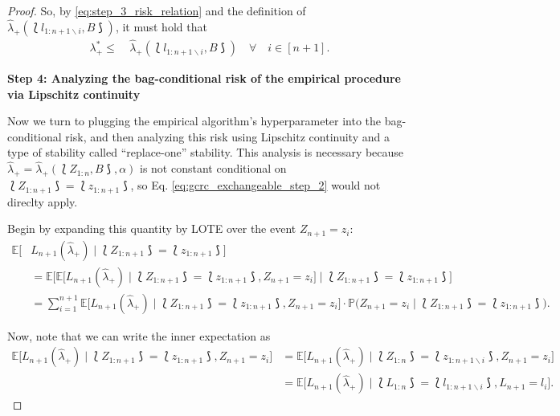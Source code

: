 \begin{proof}
So, by \eqref{eq:step_3_risk_relation} and the definition of $\hat{\lambda}_+(\lbag l_{1:n+1\backslash i}, B \rbag)$, it must hold that 
\begin{align}\label{eq:pf_step_3_result}
    \lambda_+^* \leq & \ \hat{\lambda}_+(\lbag l_{1:n+1\backslash i}, B \rbag) \quad \forall \quad i \in [n+1].
\end{align}

\vspace{1cm}

\textbf{Step 4: Analyzing the bag-conditional risk of the empirical procedure via Lipschitz continuity}

Now we turn to plugging the empirical algorithm's hyperparameter into the bag-conditional risk, and then analyzing this risk using Lipschitz continuity and a type of stability called ``replace-one'' stability. This analysis is necessary because $\hat\lambda_+=\widehat{\lambda}_+(\lbag Z_{1:n}, B\rbag, \alpha)$ is not constant conditional on $\lbag Z_{1:n+1} \rbag = \lbag z_{1:n+1} \rbag$, so Eq. \eqref{eq:gcrc_exchangeable_step_2} would not direclty apply. 

Begin by expanding this quantity by LOTE over the event $Z_{n+1}=z_i$:
\begin{align}\label{eq:empirical_bag_cond_LOTE}
    \mathbb{E}\Big[&L_{n+1}(\hat\lambda_{+}) \mid \lbag Z_{1:n+1} \rbag = \lbag z_{1:n+1} \rbag\Big] \nonumber \\
    & = \mathbb{E}\Big[\mathbb{E}\Big[L_{n+1}(\hat\lambda_{+}) \mid \lbag Z_{1:n+1} \rbag = \lbag z_{1:n+1} \rbag, Z_{n+1}=z_i\Big] \mid \lbag Z_{1:n+1} \rbag = \lbag z_{1:n+1} \rbag\Big] \nonumber \\
    & = \sum_{i=1}^{n+1}\mathbb{E}\Big[L_{n+1}(\hat\lambda_{+}) \mid \lbag Z_{1:n+1} \rbag = \lbag z_{1:n+1} \rbag, Z_{n+1}=z_i\Big]\cdot \mathbb{P}\big(Z_{n+1}=z_i \mid \lbag Z_{1:n+1} \rbag = \lbag z_{1:n+1} \rbag\big).
\end{align}

Now, note that we can write the inner expectation as
\begin{align*}
    \mathbb{E}\Big[L_{n+1}(\hat\lambda_{+}) \mid \lbag Z_{1:n+1} \rbag = \lbag z_{1:n+1} \rbag, Z_{n+1}=z_i\Big] & = \mathbb{E}\Big[L_{n+1}(\hat\lambda_{+}) \mid \lbag Z_{1:n} \rbag = \lbag z_{1:n+1\backslash i} \rbag, Z_{n+1}=z_i\Big] \\
    & = \mathbb{E}\Big[L_{n+1}(\hat\lambda_{+}) \mid \lbag L_{1:n} \rbag = \lbag l_{1:n+1\backslash i} \rbag, L_{n+1}=l_i\Big].
\end{align*}


\end{proof}
